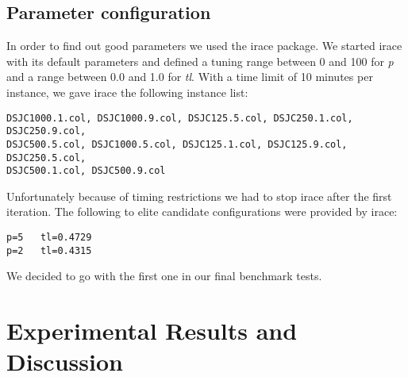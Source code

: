 \documentclass[a4paper]{scrartcl}
\begin{document}
\subsection{Parameter configuration}

In order to find out good parameters we used the irace package\cite{lopez2011irace}. We started irace with its default parameters and defined a tuning range between 0 and 100 for \emph{p} and a range between 0.0 and 1.0 for \emph{tl}.
With a time limit of 10 minutes per instance, we gave irace the following instance list:
\begin{verbatim}
DSJC1000.1.col, DSJC1000.9.col, DSJC125.5.col, DSJC250.1.col, DSJC250.9.col,
DSJC500.5.col, DSJC1000.5.col, DSJC125.1.col, DSJC125.9.col, DSJC250.5.col,
DSJC500.1.col, DSJC500.9.col
\end{verbatim}

Unfortunately because of timing restrictions we had to stop irace after the first iteration. The following to elite candidate configurations were provided by irace:

\begin{verbatim}
p=5   tl=0.4729
p=2   tl=0.4315
\end{verbatim}

We decided to go with the first one in our final benchmark tests.


\section{Experimental Results and Discussion}
\end{document}
